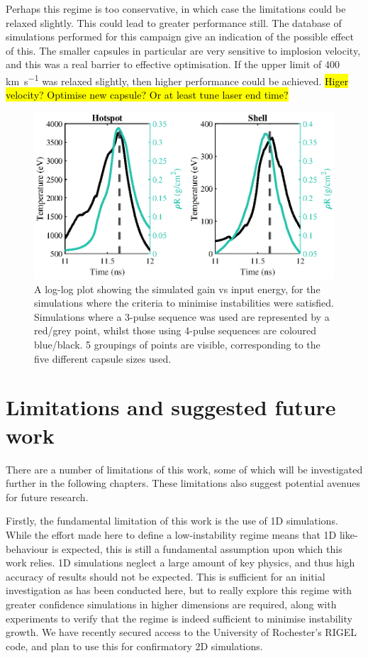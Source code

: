 Perhaps this regime is too conservative, in which case the limitations could be relaxed slightly. This could lead to greater performance still. The database of simulations performed for this campaign give an indication of the possible effect of this. The smaller capsules in particular are very sensitive to implosion velocity, and this was a real barrier to effective optimisation. If the upper limit of 400 \unit{\kilo\meter\per\second} was relaxed slightly, then higher performance could be achieved. \hl{Higer velocity? Optimise new capsule? Or at least tune laser end time?}

\begin{figure}[ht]
\centering
\includegraphics{figures/LowCR/RhoRandT.eps}
\caption{A log-log plot showing the simulated gain vs input energy, for the simulations where the criteria to minimise instabilities were satisfied. Simulations where a 3-pulse sequence was used are represented by a red/grey point, whilst those using 4-pulse sequences are coloured blue/black. 5 groupings of points are visible, corresponding to the five different capsule sizes used.}
\label{fig:HSandShellLMJ}
\end{figure}








\section{Limitations and suggested future work}
There are a number of limitations of this work, some of which will be investigated further in the following chapters. These limitations also suggest potential avenues for future research.

Firstly, the fundamental limitation of this work is the use of 1D simulations. While the effort made here to define a low-instability regime means that 1D like-behaviour is expected, this is still a fundamental assumption upon which this work relies. 1D simulations neglect a large amount of key physics, and thus high accuracy of results should not be expected. This is sufficient for an initial investigation as has been conducted here, but to really explore this regime with greater confidence simulations in higher dimensions are required, along with experiments to verify that the regime is indeed sufficient to minimise instability growth. We have recently secured access to the University of Rochester's RIGEL code, and plan to use this for confirmatory 2D simulations.

